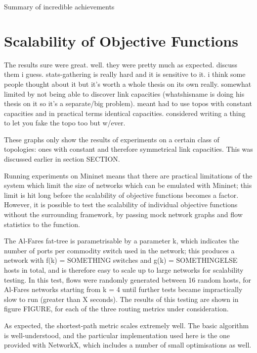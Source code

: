 \begin{table}
\caption{Summary of incredible achievements}
\end{table}

\section{Scalability of Objective Functions}
The results sure were great.
well. they were pretty much as expected. discuss them i guess.
stats-gathering is really hard and it is sensitive to it. i think some people thought
about it but it's worth a whole thesis on its own really.
somewhat limited by not being able to discover link capacities (whatshisname is
doing his thesis on it so it’s a separate/big problem). meant had to use topos with
constant capacities and in practical terms identical capacities. considered writing a
thing to let you fake the topo too but w/ever.

These graphs only show the results of experiments on a certain class of topologies: ones with constant and therefore symmetrical link capacities. This was discussed earlier in section SECTION.


Running experiments on Mininet means that there are practical limitations of the system which limit the size of networks which can be emulated with Mininet; this limit is hit long before the scalability of objective functions becomes a factor. However, it is possible to test the scalability of individual objective functions without the surrounding framework, by passing mock network graphs and flow statistics to the function. 

The Al-Fares fat-tree is parametrisable by a parameter k, which indicates the number of ports per commodity switch used in the network; this produces a network with f(k) = SOMETHING switches and g(k) = SOMETHINGELSE hosts in total, and is therefore easy to scale up to large networks for scalability testing. In this test, flows were randomly generated between 16 random hosts, for Al-Fares networks starting from k = 4 until further tests became impractically slow to run (greater than X seconds).  The results of this testing are shown in figure FIGURE, for each of the three routing metrics under consideration.

As expected, the shortest-path metric scales extremely well. The basic algorithm is well-understood, and the particular implementation used here is the one provided with NetworkX, which includes a number of small optimisations as well.

